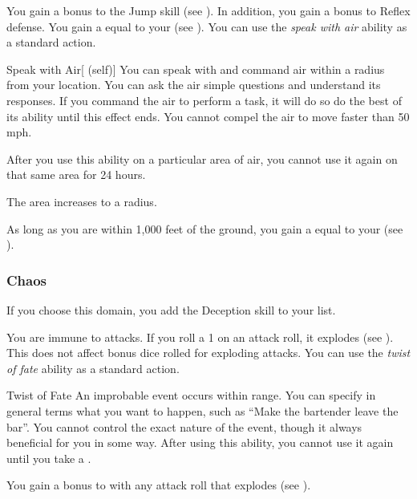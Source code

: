              You gain a  bonus to the Jump skill (see ).
            In addition, you gain a  bonus to Reflex defense.
             You gain a  equal to your  (see ).
             You can use the \textit{speak with air} ability as a standard action.
            \begin{attuneability}{Speak with Air}[ (self)]
                You can speak with and command air within a \areahuge radius  from your location.
                You can ask the air simple questions and understand its responses.
                If you command the air to perform a task, it will do so do the best of its ability until this effect ends.
                You cannot compel the air to move faster than 50 mph.

                After you use this ability on a particular area of air, you cannot use it again on that same area for 24 hours.

                \rankline
                 The area increases to a \areagarg radius.
            \end{attuneability}
             As long as you are within 1,000 feet of the ground, you gain a  equal to your  (see ).

        \subsubsection{Chaos}
            If you choose this domain, you add the Deception skill to your  list.

             You are immune to  attacks.
             If you roll a 1 on an attack roll, it explodes (see ).
            This does not affect bonus dice rolled for exploding attacks.
             You can use the \textit{twist of fate} ability as a standard action.
            \begin{freeability}{Twist of Fate}
                An improbable event occurs within \rnglong range.
                You can specify in general terms what you want to happen, such as ``Make the bartender leave the bar''.
                You cannot control the exact nature of the event, though it always beneficial for you in some way.
                After using this ability, you cannot use it again until you take a .
            \end{freeability}
             You gain a  bonus to  with any attack roll that explodes (see ).

